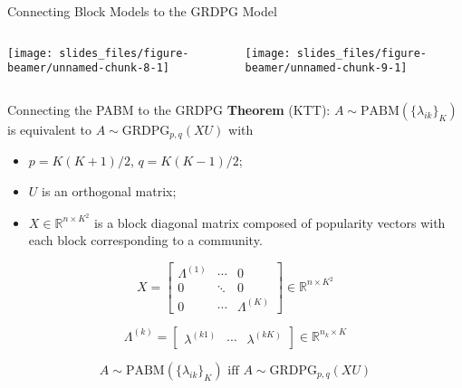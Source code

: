 \documentclass[
  ignorenonframetext,
]{beamer}
\providecommand{\tightlist}{%
  \setlength{\itemsep}{0pt}\setlength{\parskip}{0pt}}
\begin{document}
\begin{frame}{Connecting Block Models to the GRDPG Model}
\protect\hypertarget{connecting-block-models-to-the-grdpg-model-2}{}
\begin{columns}[T]
\begin{column}{0.48\textwidth}
\begin{center}\texttt{[image: slides\_files/figure-beamer/unnamed-chunk-8-1]} \end{center}
\end{column}

\begin{column}{0.48\textwidth}
\vspace*{0\baselineskip}

\begin{center}\texttt{[image: slides\_files/figure-beamer/unnamed-chunk-9-1]} \end{center}
\end{column}
\end{columns}
\end{frame}

\begin{frame}{Connecting the PABM to the GRDPG}
\protect\hypertarget{connecting-the-pabm-to-the-grdpg}{}
\textbf{Theorem} (KTT): \(A \sim \text{PABM}(\{\lambda_{ik}\}_K)\) is
equivalent to \(A \sim \text{GRDPG}_{p, q}(X U)\) with

\begin{itemize}
\tightlist
\item
  \(p = K (K + 1) / 2\), \(q = K (K - 1) / 2\);
\item
  \(U\) is an orthogonal matrix;
\item
  \(X \in \mathbb{R}^{n \times K^2}\) is a block diagonal matrix
  composed of popularity vectors with each block corresponding to a
  community.
\end{itemize}

\[X = \begin{bmatrix}
\Lambda^{(1)} & \cdots & 0 \\
0 & \ddots & 0 \\
0 & \cdots & \Lambda^{(K)}
\end{bmatrix} 
\in \mathbb{R}^{n \times K^2}\]

\[\Lambda^{(k)} = \begin{bmatrix} 
\lambda^{(k1)} & \cdots & \lambda^{(kK)} 
\end{bmatrix} 
\in \mathbb{R}^{n_k \times K}\]

\[A \sim \text{PABM}(\{\lambda_{ik}\}_K) \text{ iff } A \sim \text{GRDPG}_{p, q}(X U)\]
\end{frame}
\end{document}
